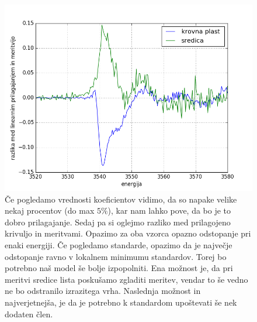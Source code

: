 \documentclass[slovene,11pt,a4paper]{article}
\numberwithin{equation}{section} %
\numberwithin{figure}{section} %
\numberwithin{table}{section} %
\begin{document}
\begin{figure}[ht]
\begin{center}
\includegraphics[scale=0.7]{slike/razlika_spekter.png}
\end{center}
\caption{Če pogledamo vrednosti koeficientov vidimo, da so napake velike nekaj procentov (do max $5\%$), kar nam lahko pove, da bo je to dobro prilagajanje. Sedaj pa si oglejmo razliko med prilagojeno krivuljo in meritvami. Opazimo za oba vzorca opazno odstopanje pri enaki energiji. Če pogledamo standarde, opazimo da je največje odstopanje ravno v lokalnem minimumu standardov. Torej bo potrebno naš model še bolje izpopolniti. Ena možnost je, da pri meritvi sredice lista poskušamo zgladiti meritev, vendar to še vedno ne bo odstranilo izrazitega vrha. Naslednja možnost in najverjetnejša, je da je potrebno k standardom upoštevati še nek dodaten člen.}
\end{figure}


\end{document}
